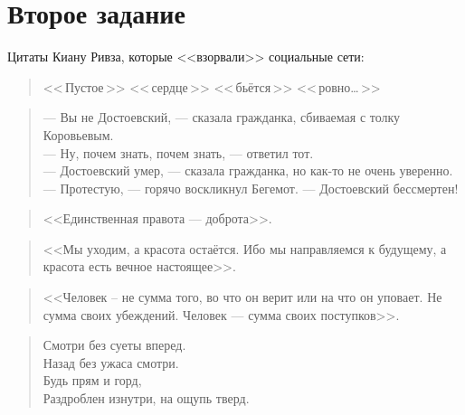 \documentclass[a4paper,11pt]{article} %
\begin{document}
	\section{Второе задание}
	\qquad Цитаты Киану Ривза, которые <<взорвали>> социальные сети:
	\begin{quote}
		<<\,\glqq Пустое\grqq\,>> <<\,\glqq сердце\grqq\,>> <<\,\glqq бьётся\grqq\,>> <<\,\glqq ровно…\grqq\,>>
	\end{quote}
	\begin{quote}
		--- Вы не Достоевский, --- сказала гражданка, сбиваемая с толку Коровьевым. \\
		--- Ну, почем знать, почем знать, --- ответил тот. \\
		--- Достоевский умер, — сказала гражданка, но как-то не очень уверенно. \\
		--- Протестую, --- горячо воскликнул Бегемот. --- Достоевский бессмертен!
	\end{quote}
	\begin{quote}
		<<Единственная правота --- доброта>>.
	\end{quote}
	\begin{quote}
		<<Мы уходим, а красота остаётся. Ибо мы направляемся к будущему, а красота есть вечное настоящее>>.
	\end{quote}
	\begin{quote}
		<<Человек – не сумма того, во что он верит или на что он уповает. Не сумма своих убеждений. Человек --- сумма своих поступков>>.
	\end{quote}
	\begin{quote}
		\begin{center}
			Смотри без суеты вперед. \\
			Назад без ужаса смотри. \\
			Будь прям и горд, \\
			Раздроблен изнутри, на ощупь тверд.
		\end{center}
	\end{quote}
\end{document}
